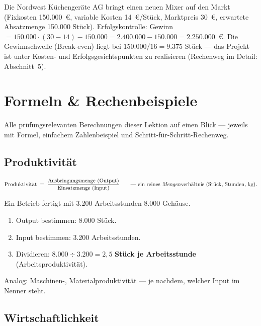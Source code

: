 \documentclass[11pt, a4paper]{article}
\begin{document}
\begin{beispiel}
Die Nordwest Küchengeräte AG bringt einen neuen Mixer auf den Markt (Fixkosten
150.000~€, variable Kosten 14~€/Stück, Marktpreis 30~€, erwartete Absatzmenge
150.000 Stück). Erfolgskontrolle: Gewinn $= 150.000 \cdot (30 - 14) - 150.000 =
2.400.000 - 150.000 = 2.250.000$~€. Die Gewinnschwelle (Break-even) liegt bei
$150.000 / 16 = 9.375$ Stück --- das Projekt ist unter Kosten- und
Erfolgsgesichtspunkten zu realisieren (Rechenweg im Detail: Abschnitt~5).
\end{beispiel}

\section{Formeln \& Rechenbeispiele}

Alle prüfungsrelevanten Berechnungen dieser Lektion auf einen Blick --- jeweils mit
Formel, einfachem Zahlenbeispiel und Schritt-für-Schritt-Rechenweg.

\subsection{Produktivität}

\begin{merksatz}[title={\bfseries Formel: Produktivität}]
\[
\text{Produktivität} \;=\; \frac{\text{Ausbringungsmenge (Output)}}{\text{Einsatzmenge (Input)}}
\qquad \text{--- ein reines \emph{Mengen}verhältnis (Stück, Stunden, kg).}
\]
\end{merksatz}

\begin{beispiel}
Ein Betrieb fertigt mit 3.200 Arbeitsstunden 8.000 Gehäuse.
\begin{enumerate}
  \item Output bestimmen: 8.000 Stück.
  \item Input bestimmen: 3.200 Arbeitsstunden.
  \item Dividieren: $8.000 \div 3.200 = 2{,}5$ \textbf{Stück je Arbeitsstunde}
    (Arbeitsproduktivität).
\end{enumerate}
Analog: Maschinen-, Materialproduktivität --- je nachdem, welcher Input im Nenner steht.
\end{beispiel}

\subsection{Wirtschaftlichkeit}
\end{document}
